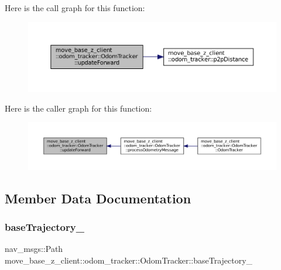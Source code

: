 Here is the call graph for this function\+:
\nopagebreak
\begin{figure}[H]
\begin{center}
\leavevmode
\includegraphics[width=350pt]{classmove__base__z__client_1_1odom__tracker_1_1OdomTracker_a12cee73239bc7685c645f8f52859b61f_cgraph}
\end{center}
\end{figure}
Here is the caller graph for this function\+:
\nopagebreak
\begin{figure}[H]
\begin{center}
\leavevmode
\includegraphics[width=350pt]{classmove__base__z__client_1_1odom__tracker_1_1OdomTracker_a12cee73239bc7685c645f8f52859b61f_icgraph}
\end{center}
\end{figure}


\subsection{Member Data Documentation}
\mbox{\label{classmove__base__z__client_1_1odom__tracker_1_1OdomTracker_a83fa5a9bfe0b2683eee33444d3f030ea}} 
\subsubsection{\texorpdfstring{base\+Trajectory\+\_\+}{baseTrajectory\_}}
{\footnotesize\ttfamily nav\+\_\+msgs\+::\+Path move\+\_\+base\+\_\+z\+\_\+client\+::odom\+\_\+tracker\+::\+Odom\+Tracker\+::base\+Trajectory\+\_\+\hspace{0.3cm}{\ttfamily [protected]}}



